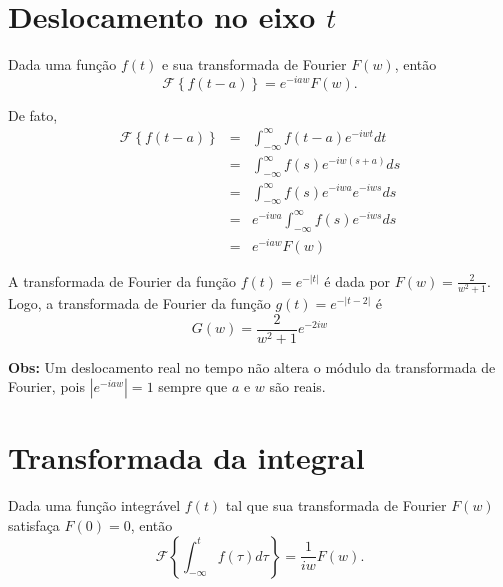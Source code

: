 \documentclass[a4paper,10pt]{book}
\begin{document}
\section{Deslocamento no eixo $t$}

Dada uma função $f(t)$ e sua transformada de Fourier $F(w)$, então
 \begin{equation}
 \mathcal{F}\left\{f(t-a)\right\}=e^{-iaw}F(w).
 \end{equation}
 
 De fato,
 \begin{eqnarray*}
 \mathcal{F}\left\{f(t-a)\right\}&=&\int_{-\infty}^\infty  f(t-a)e^{-iwt}dt \\
 &=&\int_{-\infty}^\infty  f(s)e^{-iw(s+a)}ds \\
 &=&\int_{-\infty}^\infty  f(s)e^{-iwa}e^{-iws}ds \\
 &=&e^{-iwa}\int_{-\infty}^\infty  f(s)e^{-iws}ds \\
 &=&e^{-iaw}F(w)
 \end{eqnarray*}

 
A transformada de Fourier da função $f(t)=e^{-|t|}$ é dada por $F(w)=\frac{2}{w^2+1}$. Logo, a transformada de Fourier da função $g(t)=e^{-|t-2|}$ é
 \begin{equation}
 G(w)=\frac{2}{w^2+1}e^{-2iw}
 \end{equation}

  {\bf Obs:} Um deslocamento real no tempo não altera o módulo da transformada de Fourier, pois $|e^{-iaw}|=1$ sempre que $a$ e $w$ são reais.

\section{Transformada da integral}
  Dada uma função integrável $f(t)$ tal que sua transformada de Fourier $F(w)$ satisfaça $F(0)=0$, então
   \begin{equation}
 \mathcal{F}\left\{\int_{-\infty}^t f(\tau)d\tau \right\}=\frac{1}{iw}F(w).
 \end{equation}
\end{document}
